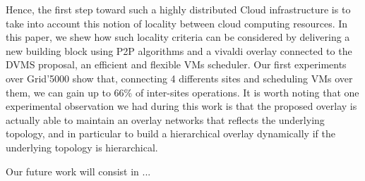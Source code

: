 Hence, the first step toward such a highly distributed Cloud infrastructure is
to take into account this notion of locality between cloud computing resources.
In this paper, we shew how such locality criteria can be considered by
delivering a new building block using  P2P algorithms and a vivaldi overlay
connected to the DVMS proposal, an efficient and flexible VMs scheduler.  Our
first experiments over Grid'5000 show that, connecting 4 differents sites and
scheduling VMs over them, we can gain up to 66\% of inter-sites operations. It
is worth noting that one experimental observation we had during this work is
that the proposed overlay is actually able to maintain an overlay networks that
reflects the underlying topology, and in particular to build a hierarchical
overlay dynamically if the underlying topology is hierarchical.

Our future work will consist in ... 

